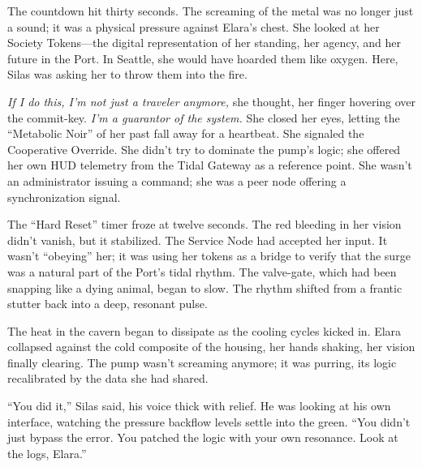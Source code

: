 
The countdown hit thirty seconds. The screaming of the metal was no longer just a sound; it was a physical pressure against Elara's chest. She looked at her Society Tokens—the digital representation of her standing, her agency, and her future in the Port. In Seattle, she would have hoarded them like oxygen. Here, Silas was asking her to throw them into the fire.

\textit{If I do this, I'm not just a traveler anymore,} she thought, her finger hovering over the commit-key. \textit{I'm a guarantor of the system.} She closed her eyes, letting the ``Metabolic Noir'' of her past fall away for a heartbeat. She signaled the Cooperative Override. She didn't try to dominate the pump's logic; she offered her own HUD telemetry from the Tidal Gateway as a reference point. She wasn't an administrator issuing a command; she was a peer node offering a synchronization signal.


The ``Hard Reset'' timer froze at twelve seconds. The red bleeding in her vision didn't vanish, but it stabilized. The Service Node had accepted her input. It wasn't ``obeying'' her; it was using her tokens as a bridge to verify that the surge was a natural part of the Port's tidal rhythm. The valve-gate, which had been snapping like a dying animal, began to slow. The rhythm shifted from a frantic stutter back into a deep, resonant pulse. 


The heat in the cavern began to dissipate as the cooling cycles kicked in. Elara collapsed against the cold composite of the housing, her hands shaking, her vision finally clearing. The pump wasn't screaming anymore; it was purring, its logic recalibrated by the data she had shared. 

``You did it,'' Silas said, his voice thick with relief. He was looking at his own interface, watching the pressure backflow levels settle into the green. ``You didn't just bypass the error. You patched the logic with your own resonance. Look at the logs, Elara.''

